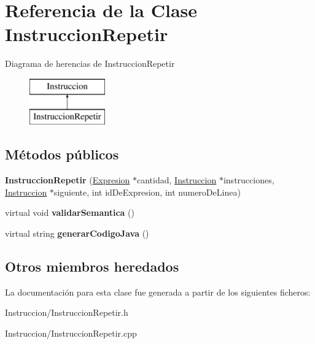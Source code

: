 \hypertarget{class_instruccion_repetir}{\section{Referencia de la Clase Instruccion\-Repetir}
\label{class_instruccion_repetir}
}
Diagrama de herencias de Instruccion\-Repetir\begin{figure}[H]
\begin{center}
\leavevmode
\includegraphics[height=2.000000cm]{class_instruccion_repetir}
\end{center}
\end{figure}
\subsection*{Métodos públicos}
\begin{DoxyCompactItemize}
\item 
\hypertarget{class_instruccion_repetir_a875f3bae2adb85cacb6cc44544fb9723}{{\bfseries Instruccion\-Repetir} (\hyperlink{class_expresion}{Expresion} $\ast$cantidad, \hyperlink{class_instruccion}{Instruccion} $\ast$instrucciones, \hyperlink{class_instruccion}{Instruccion} $\ast$siguiente, int id\-De\-Expresion, int numero\-De\-Linea)}\label{class_instruccion_repetir_a875f3bae2adb85cacb6cc44544fb9723}

\item 
\hypertarget{class_instruccion_repetir_aa5481045a63c0b8d291906cf9ff447ec}{virtual void {\bfseries validar\-Semantica} ()}\label{class_instruccion_repetir_aa5481045a63c0b8d291906cf9ff447ec}

\item 
\hypertarget{class_instruccion_repetir_a3eb806856e86707007b5578eba019545}{virtual string {\bfseries generar\-Codigo\-Java} ()}\label{class_instruccion_repetir_a3eb806856e86707007b5578eba019545}

\end{DoxyCompactItemize}
\subsection*{Otros miembros heredados}


La documentación para esta clase fue generada a partir de los siguientes ficheros\-:\begin{DoxyCompactItemize}
\item 
Instruccion/Instruccion\-Repetir.\-h\item 
Instruccion/Instruccion\-Repetir.\-cpp\end{DoxyCompactItemize}
